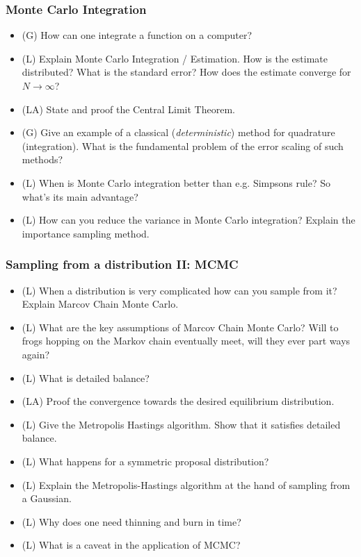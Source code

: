 \subsubsection*{Monte Carlo Integration}
\begin{itemize}
    \item (G) How can one integrate a function on a computer?
    \answerboxM
    \item (L) Explain Monte Carlo Integration / Estimation. How is the estimate distributed? What is the standard error? How does the estimate converge for $N \rightarrow \infty$?
    \answerboxL
    \item (LA) State and proof the Central Limit Theorem.
    \answerboxL
    \item (G) Give an example of a classical (\textit{deterministic}) method for quadrature (integration). What is the fundamental problem of the error scaling of such methods?
    \answerboxM
    \item (L) When is Monte Carlo integration better than e.g. Simpsons rule? So what's its main advantage?
    \answerboxL
    \item (L) How can you reduce the variance in Monte Carlo integration? Explain the importance sampling method.
    \answerboxL
\end{itemize}

\subsubsection*{Sampling from a distribution II: MCMC}

\begin{itemize}
    \item (L) When a distribution is very complicated how can you sample from it? Explain Marcov Chain Monte Carlo.
    \answerboxM
    \item (L) What are the key assumptions of Marcov Chain Monte Carlo? Will to frogs hopping on the Markov chain eventually meet, will they ever part ways again?
    \answerboxM
    \item (L) What is detailed balance?
    \answerboxM
    \item (LA) Proof the convergence towards the desired equilibrium distribution.
    \answerboxL
    \item (L) Give the Metropolis Hastings algorithm. Show that it satisfies detailed balance.
    \answerboxL
    \item (L) What happens for a symmetric proposal distribution?
    \answerboxM
    \item (L) Explain the Metropolis-Hastings algorithm at the hand of sampling from a Gaussian.
    \answerboxL
    \item (L) Why does one need thinning and burn in time?
    \answerboxM
    \item (L) What is a caveat in the application of MCMC?
    \answerboxM
\end{itemize}

